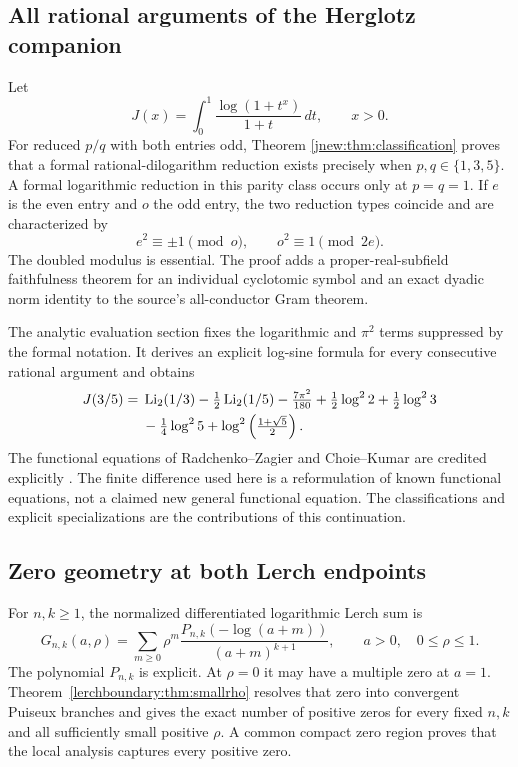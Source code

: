 \subsection{All rational arguments of the Herglotz companion}

Let
\[
J(x)=\int_0^1\frac{\log(1+t^x)}{1+t}\,dt,\qquad x>0.
\]
For reduced $p/q$ with both entries odd, Theorem
\ref{jnew:thm:classification} proves that a formal rational-dilogarithm
reduction exists precisely when $p,q\in\{1,3,5\}$. A formal logarithmic
reduction in this parity class occurs only at $p=q=1$. If $e$ is the
even entry and $o$ the odd entry, the two reduction types coincide and
are characterized by
\[
e^2\equiv\pm1\pmod o,\qquad o^2\equiv1\pmod{2e}.
\]
The doubled modulus is essential. The proof adds a proper-real-subfield
faithfulness theorem for an individual cyclotomic symbol and an exact
dyadic norm identity to the source's all-conductor Gram theorem.

The analytic evaluation section fixes the logarithmic and $\pi^2$
terms suppressed by the formal notation. It derives an explicit
log-sine formula for every consecutive rational argument and obtains
\[
\begin{aligned}
J(3/5)={}&\operatorname{Li}_2(1/3)-\tfrac12\operatorname{Li}_2(1/5)-\tfrac{7\pi^2}{180}
 +\tfrac12\log^2 2+\tfrac12\log^2 3\\
&-\tfrac14\log^2 5+\log^2\left(\tfrac{1+\sqrt5}{2}\right).
\end{aligned}
\]
The functional equations of Radchenko--Zagier and Choie--Kumar are
credited explicitly \cite{RadchenkoZagier,ChoieKumar2023}. The finite
difference used here is a reformulation of known functional equations,
not a claimed new general functional equation. The classifications and
explicit specializations are the contributions of this continuation.

\subsection{Zero geometry at both Lerch endpoints}

For $n,k\geq1$, the normalized differentiated logarithmic Lerch sum is
\[
G_{n,k}(a,\rho)=\sum_{m\geq0}\rho^m
\frac{P_{n,k}(-\log(a+m))}{(a+m)^{k+1}},\qquad a>0,\quad 0\leq\rho\leq1.
\]
The polynomial $P_{n,k}$ is explicit. At $\rho=0$ it may have a
multiple zero at $a=1$. Theorem~\ref{lerchboundary:thm:smallrho}
resolves that zero into convergent Puiseux branches and gives the exact
number of positive zeros for every fixed $n,k$ and all sufficiently
small positive $\rho$. A common compact zero region proves that the
local analysis captures every positive zero.

